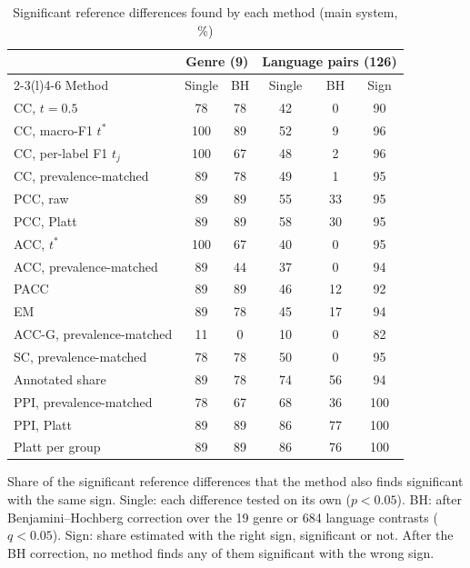 \begin{table}[t]
\caption{Significant reference differences found by each method (main system, \%)}
\label{tab:detection}
\centering
\scriptsize
\setlength{\tabcolsep}{2.5pt}
\begin{tabular*}{\columnwidth}{@{\extracolsep{\fill}}lccccc@{}}
\toprule
 & \multicolumn{2}{c}{Genre (9)} & \multicolumn{3}{c}{Language pairs (126)} \\
\cmidrule(lr){2-3}\cmidrule(l){4-6}
Method & Single & BH & Single & BH & Sign \\
\midrule
CC, $t = 0.5$ & 78 & 78 & 42 & 0 & 90 \\
CC, macro-F1 $t^*$ & 100 & 89 & 52 & 9 & 96 \\
CC, per-label F1 $t_j$ & 100 & 67 & 48 & 2 & 96 \\
CC, prevalence-matched & 89 & 78 & 49 & 1 & 95 \\
PCC, raw & 89 & 89 & 55 & 33 & 95 \\
PCC, Platt & 89 & 89 & 58 & 30 & 95 \\
ACC, $t^*$ & 100 & 67 & 40 & 0 & 95 \\
ACC, prevalence-matched & 89 & 44 & 37 & 0 & 94 \\
PACC & 89 & 89 & 46 & 12 & 92 \\
EM & 89 & 78 & 45 & 17 & 94 \\
ACC-G, prevalence-matched & 11 & 0 & 10 & 0 & 82 \\
SC, prevalence-matched & 78 & 78 & 50 & 0 & 95 \\
Annotated share & 89 & 78 & 74 & 56 & 94 \\
PPI, prevalence-matched & 78 & 67 & 68 & 36 & 100 \\
PPI, Platt & 89 & 89 & 86 & 77 & 100 \\
Platt per group & 89 & 89 & 86 & 76 & 100 \\
\bottomrule
\end{tabular*}
\par\vspace{2pt}
\begin{minipage}{\columnwidth}\scriptsize Share of the significant reference differences that the method also finds significant with the same sign. Single: each difference tested on its own ($p < 0.05$). BH: after Benjamini--Hochberg correction over the 19 genre or 684 language contrasts ($q < 0.05$). Sign: share estimated with the right sign, significant or not. After the BH correction, no method finds any of them significant with the wrong sign.\end{minipage}
\end{table}

